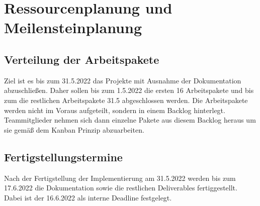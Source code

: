 \section{Ressourcenplanung und Meilensteinplanung}

\subsection{Verteilung der Arbeitspakete}

Ziel ist es bis zum 31.5.2022 das Projekte mit Ausnahme der Dokumentation abzuschließen.
Daher sollen bis zum 1.5.2022 die ersten 16 Arbeitspakete und bis zum die restlichen Arbeitspakete 31.5 abgeschlossen werden.
Die Arbeitspakete werden nicht im Voraus aufgeteilt, sondern in einem Backlog hinterlegt. 
Teammitglieder nehmen sich dann einzelne Pakete aus diesem Backlog heraus um sie gemäß dem Kanban Prinzip abzuarbeiten.


\subsection{Fertigstellungstermine}

Nach der Fertigstellung der Implementierung am 31.5.2022 werden bis zum 17.6.2022 die Dokumentation sowie die restlichen Deliverables fertiggestellt.
Dabei ist der 16.6.2022 als interne Deadline festgelegt.
